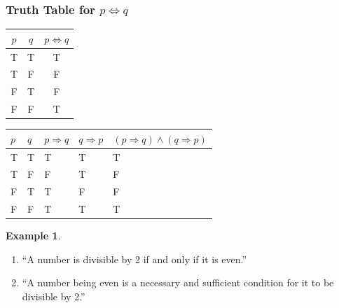 \documentclass[
]{book}
\providecommand{\tightlist}{%
  \setlength{\itemsep}{0pt}\setlength{\parskip}{0pt}}
\theoremstyle{definition}
\theoremstyle{definition}
\newtheorem{example}{Example}[chapter]
\theoremstyle{definition}
\theoremstyle{definition}
\theoremstyle{remark}
\begin{document}
\subsubsection{\texorpdfstring{Truth Table for \(p \iff q\)}{Truth Table for p \textbackslash iff q}}\label{truth-table-for-p-iff-q}

\begin{longtable}[]{@{}ccc@{}}
\toprule\noalign{}
\(p\) & \(q\) & \(p \iff q\) \\
\midrule\noalign{}
\endhead
\bottomrule\noalign{}
\endlastfoot
T & T & T \\
T & F & F \\
F & T & F \\
F & F & T \\
\end{longtable}

\begin{longtable}[]{@{}
  >{\centering\arraybackslash}p{}
  >{\centering\arraybackslash}p{}
  >{\centering\arraybackslash}p{}
  >{\centering\arraybackslash}p{}
  >{\centering\arraybackslash}p{}@{}}
\toprule\noalign{}
\begin{minipage}[b]{\linewidth}\centering
\(p\)
\end{minipage} & \begin{minipage}[b]{\linewidth}\centering
\(q\)
\end{minipage} & \begin{minipage}[b]{\linewidth}\centering
\(p \Rightarrow q\)
\end{minipage} & \begin{minipage}[b]{\linewidth}\centering
\(q \Rightarrow p\)
\end{minipage} & \begin{minipage}[b]{\linewidth}\centering
\((p \Rightarrow q) \land (q \Rightarrow p)\)
\end{minipage} \\
\midrule\noalign{}
\endhead
\bottomrule\noalign{}
\endlastfoot
T & T & T & T & T \\
T & F & F & T & F \\
F & T & T & F & F \\
F & F & T & T & T \\
\end{longtable}

\begin{example}
\protect\hypertarget{exm:unnamed-chunk-28}{}\label{exm:unnamed-chunk-28}\leavevmode

\begin{enumerate}
\def\labelenumi{\arabic{enumi}.}
\tightlist
\item
  ``A number is divisible by 2 if and only if it is even.''
\item
  ``A number being even is a necessary and sufficient condition for it to be divisible by 2.''
\end{enumerate}

\end{example}
\end{document}

